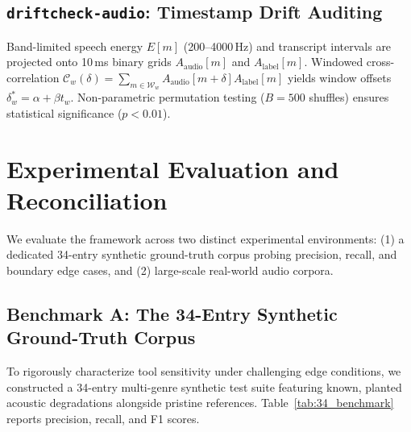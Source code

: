 \documentclass[10pt,journal,compsoc]{IEEEtran}
\begin{document}
\subsection{\texttt{driftcheck-audio}: Timestamp Drift Auditing}
Band-limited speech energy $E[m]$ (200--4000\,Hz) and transcript intervals are projected onto 10\,ms binary grids $A_{\text{audio}}[m]$ and $A_{\text{label}}[m]$. Windowed cross-correlation $\mathcal{C}_w(\delta) = \sum_{m \in \mathcal{W}_w} A_{\text{audio}}[m+\delta] A_{\text{label}}[m]$ yields window offsets $\delta_w^* = \alpha + \beta t_w$. Non-parametric permutation testing ($B=500$ shuffles) ensures statistical significance ($p < 0.01$).

\section{Experimental Evaluation and Reconciliation}
We evaluate the framework across two distinct experimental environments: (1) a dedicated 34-entry synthetic ground-truth corpus probing precision, recall, and boundary edge cases, and (2) large-scale real-world audio corpora.

\subsection{Benchmark A: The 34-Entry Synthetic Ground-Truth Corpus}
To rigorously characterize tool sensitivity under challenging edge conditions, we constructed a 34-entry multi-genre synthetic test suite featuring known, planted acoustic degradations alongside pristine references. Table~\ref{tab:34_benchmark} reports precision, recall, and F1 scores.
\end{document}
